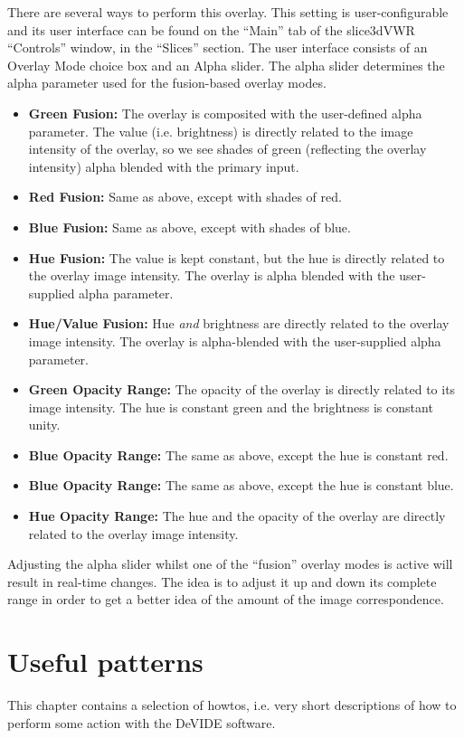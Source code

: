 There are several ways to perform this overlay.  This setting is
user-configurable and its user interface can be found on the ``Main''
tab of the slice3dVWR ``Controls'' window, in the ``Slices'' section.
The user interface consists of an Overlay Mode choice box and an Alpha
slider.  The alpha slider determines the alpha parameter used for the
fusion-based overlay modes.

\begin{itemize}
\item {\bf Green Fusion:} The overlay is composited with the
  user-defined alpha parameter.  The value (i.e. brightness) is
  directly related to the image intensity of the overlay, so we see
  shades of green (reflecting the overlay intensity) alpha blended with
  the primary input.
\item {\bf Red Fusion:} Same as above, except with shades of red.
\item {\bf Blue Fusion:} Same as above, except with shades of blue.
\item {\bf Hue Fusion:} The value is kept constant, but the hue is
  directly related to the overlay image intensity.  The overlay is
  alpha blended with the user-supplied alpha parameter.
\item {\bf Hue/Value Fusion:} Hue {\em and} brightness are directly
  related to the overlay image intensity.  The overlay is
  alpha-blended with the user-supplied alpha parameter.
\item {\bf Green Opacity Range:} The opacity of the overlay is
  directly related to its image intensity.  The hue is constant green
  and the brightness is constant unity.
\item {\bf Blue Opacity Range:} The same as above, except the hue is
  constant red.
\item {\bf Blue Opacity Range:} The same as above, except the hue is
  constant blue.
\item {\bf Hue Opacity Range:} The hue and the opacity of the overlay
  are directly related to the overlay image intensity.
\end{itemize}

Adjusting the alpha slider whilst one of the ``fusion'' overlay modes
is active will result in real-time changes.  The idea is to adjust it
up and down its complete range in order to get a better idea of the
amount of the image correspondence.

\chapter{Useful patterns}
This chapter contains a selection of howtos, i.e. very short
descriptions of how to perform some action with the DeVIDE software.


